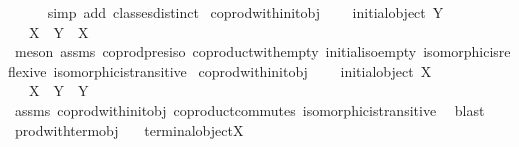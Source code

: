 \begin{isabellebody}
\ \ \ \ \isamarkupfalse%
\ {\isacharparenleft}{\kern0pt}simp\ add{\isacharcolon}{\kern0pt}\ classes{\isacharunderscore}{\kern0pt}distinct{\isacharparenright}{\kern0pt}\isanewline
{}\isamarkupfalse%
%
\endisatagproof
{\isafoldproof}%
%
\isadelimproof
\isanewline
%
\endisadelimproof
\isanewline
{}\isamarkupfalse%
\ coprod{\isacharunderscore}{\kern0pt}with{\isacharunderscore}{\kern0pt}init{\isacharunderscore}{\kern0pt}obj{}{\isacharcolon}{\kern0pt}\ \isanewline
\ \ \ {\isachardoublequoteopen}initial{\isacharunderscore}{\kern0pt}object\ Y{\isachardoublequoteclose}\isanewline
\ \ \ {\isachardoublequoteopen}X\ {\isasymCoprod}\ Y\ {\isasymcong}\ X{\isachardoublequoteclose}\isanewline
%
\isadelimproof
\ \ %
\endisadelimproof
%
\isatagproof
{}\isamarkupfalse%
\ {\isacharparenleft}{\kern0pt}meson\ assms\ coprod{\isacharunderscore}{\kern0pt}pres{\isacharunderscore}{\kern0pt}iso\ coproduct{\isacharunderscore}{\kern0pt}with{\isacharunderscore}{\kern0pt}empty\ initial{\isacharunderscore}{\kern0pt}iso{\isacharunderscore}{\kern0pt}empty\ isomorphic{\isacharunderscore}{\kern0pt}is{\isacharunderscore}{\kern0pt}reflexive\ isomorphic{\isacharunderscore}{\kern0pt}is{\isacharunderscore}{\kern0pt}transitive{\isacharparenright}{\kern0pt}%
\endisatagproof
{\isafoldproof}%
%
\isadelimproof
\isanewline
%
\endisadelimproof
\isanewline
{}\isamarkupfalse%
\ coprod{\isacharunderscore}{\kern0pt}with{\isacharunderscore}{\kern0pt}init{\isacharunderscore}{\kern0pt}obj{}{\isacharcolon}{\kern0pt}\ \isanewline
\ \ \ {\isachardoublequoteopen}initial{\isacharunderscore}{\kern0pt}object\ X{\isachardoublequoteclose}\isanewline
\ \ \ {\isachardoublequoteopen}X\ {\isasymCoprod}\ Y\ {\isasymcong}\ Y{\isachardoublequoteclose}\isanewline
%
\isadelimproof
\ \ %
\endisadelimproof
%
\isatagproof
{}\isamarkupfalse%
\ assms\ coprod{\isacharunderscore}{\kern0pt}with{\isacharunderscore}{\kern0pt}init{\isacharunderscore}{\kern0pt}obj{}\ coproduct{\isacharunderscore}{\kern0pt}commutes\ isomorphic{\isacharunderscore}{\kern0pt}is{\isacharunderscore}{\kern0pt}transitive\ \isamarkupfalse%
\ blast%
\endisatagproof
{\isafoldproof}%
%
\isadelimproof
\isanewline
%
\endisadelimproof
\isanewline
{}\isamarkupfalse%
\ prod{\isacharunderscore}{\kern0pt}with{\isacharunderscore}{\kern0pt}term{\isacharunderscore}{\kern0pt}obj{}{\isacharcolon}{\kern0pt}\isanewline
\ \ \ {\isachardoublequoteopen}terminal{\isacharunderscore}{\kern0pt}object{\isacharparenleft}{\kern0pt}X{\isacharparenright}{\kern0pt}{\isachardoublequoteclose}\ \isanewline

\end{isabellebody}
